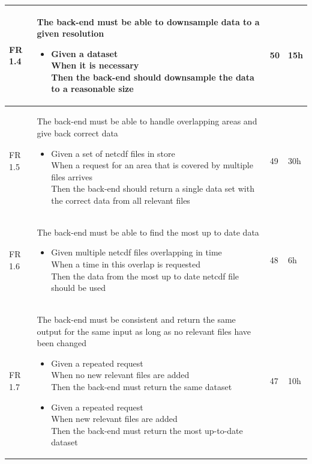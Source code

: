 \documentclass[11pt,a4paper,titlepage,oneside]{report}
\begin{document}
\begin{longtable}{p{1.4cm} p{7.8cm} p{1cm} p{1cm} }
  FR 1.4 & The \gls{back-end} must be able to downsample data to a given resolution 
  \begin{itemize}
  \item \parbox[t]{6.8cm}{
        Given a dataset \\ 
        When it is necessary \\ 
        Then the \gls{back-end} should downsample the data to a reasonable size}
  \end{itemize}
  & 50 & 15h \\ \hline

  FR 1.5 & The \gls{back-end} must be able to handle overlapping areas and give back correct data
  \begin{itemize}
  \item \parbox[t]{6.8cm}{
        Given a set of \gls{netcdf} files in store \\
        When a request for an area that is covered by multiple files arrives \\
        Then the \gls{back-end} should return a single data set with the correct data from all relevant files}
  \end{itemize}
  & 49 & 30h \\ \hline

  FR 1.6 & The \gls{back-end} must be able to find the most up to date data
  \begin{itemize}
  \item \parbox[t]{6.8cm}{
        Given multiple \gls{netcdf} files overlapping in time \\
        When a time in this overlap is requested \\
        Then the data from the most up to date \gls{netcdf} file should be used}
  \end{itemize}
  & 48 & 6h \\ \hline

  FR 1.7 & The \gls{back-end} must be consistent and return the same output for the same input as long as no relevant files have been changed
  \begin{itemize}
  \item \parbox[t]{6.8cm}{
        Given a repeated request \\
        When no new relevant files are added \\
        Then the \gls{back-end} must return the same dataset}
  \item \parbox[t]{6.8cm}{
        Given a repeated request \\
        When new relevant files are added \\
        Then the \gls{back-end} must return the most up-to-date dataset}
  \end{itemize}
  & 47 & 10h \\ \hline


\end{longtable}
\end{document}
